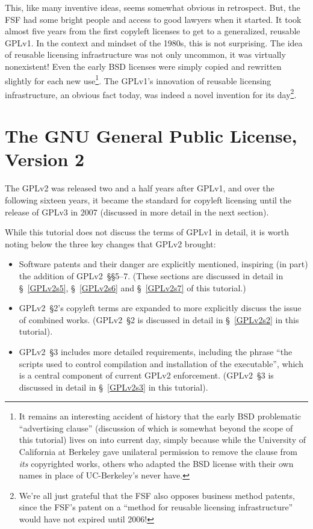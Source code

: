 This, like many inventive ideas, seems somewhat obvious in retrospect.  But,
the FSF had some bright people and access to good lawyers when it started.
It took almost five years from the first copyleft licenses to get to a
generalized, reusable GPLv1.  In the context and mindset of the 1980s, this
is not surprising.  The idea of reusable licensing infrastructure was not
only uncommon, it was virtually nonexistent!  Even the early BSD licenses
were simply copied and rewritten slightly for each new use\footnote{It
  remains an interesting accident of history that the early BSD problematic
  ``advertising clause'' (discussion of which is somewhat beyond the scope of
  this tutorial) lives on into current day, simply because while the
  University of California at Berkeley gave unilateral permission to remove
  the clause from \textit{its} copyrighted works, others who adapted the BSD
  license with their own names in place of UC-Berkeley's never have.}.  The
GPLv1's innovation of reusable licensing infrastructure, an obvious fact
today, was indeed a novel invention for its day\footnote{We're all just
  grateful that the FSF also opposes business method patents, since the FSF's
  patent on a ``method for reusable licensing infrastructure'' would have
  not expired until 2006!}.

\section{The GNU General Public License, Version 2}

The GPLv2 was released two and a half years after GPLv1, and over the
following sixteen years, it became the standard for copyleft licensing until
the release of GPLv3 in 2007 (discussed in more detail in the next section).

While this tutorial does not discuss the terms of GPLv1 in detail, it is
worth noting below the three key changes that GPLv2 brought:

\begin{itemize}

\item Software patents and their danger are explicitly mentioned, inspiring
  (in part) the addition of GPLv2~\S\S5--7.  (These sections are discussed in
  detail in \S~\ref{GPLv2s5}, \S~\ref{GPLv2s6} and \S~\ref{GPLv2s7} of this
  tutorial.)

\item GPLv2~\S2's copyleft terms are expanded to more explicitly discuss the
  issue of combined works.  (GPLv2~\S2 is discussed in detail in
  \S~\ref{GPLv2s2} in this tutorial).

\item GPLv2~\S3 includes more detailed requirements, including the phrase
 ``the scripts used to control compilation and installation of the
  executable'', which is a central component of current GPLv2 enforcement.
  (GPLv2~\S3 is discussed in detail in
  \S~\ref{GPLv2s3} in this tutorial).
\end{itemize}

